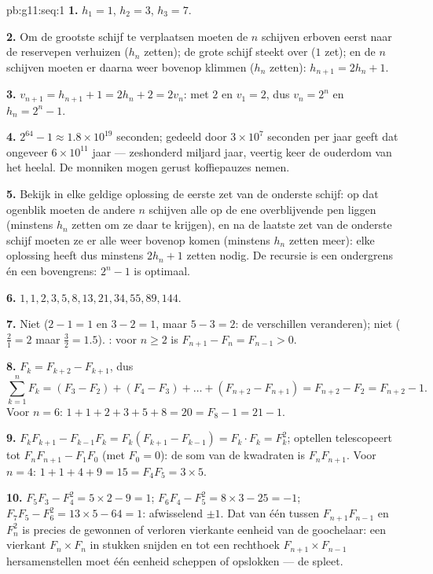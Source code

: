 \begin{solution}{pb:g11:seq:1}
\textbf{1.} $h_1 = 1$, $h_2 = 3$, $h_3 = 7$.

\textbf{2.} Om de grootste schijf te verplaatsen moeten de $n$ schijven
erboven eerst naar de reservepen verhuizen ($h_n$ zetten); de grote schijf
steekt over ($1$ zet); en de $n$ schijven moeten er daarna weer bovenop
klimmen ($h_n$ zetten): $h_{n+1} = 2h_n + 1$.

\textbf{3.} $v_{n+1} = h_{n+1} + 1 = 2h_n + 2 = 2v_n$:  met 
$2$ en $v_1 = 2$, dus $v_n = 2^n$ en $h_n = 2^n - 1$.

\textbf{4.} $2^{64} - 1 \approx 1.8 \times 10^{19}$ seconden; gedeeld door
$3 \times 10^7$ seconden per jaar geeft dat ongeveer $6 \times 10^{11}$
jaar --- zeshonderd miljard jaar, veertig keer de ouderdom van het heelal.
De monniken mogen gerust koffiepauzes nemen.

\textbf{5.} Bekijk in elke geldige oplossing de eerste zet van de onderste
schijf: op dat ogenblik moeten de andere $n$ schijven alle op de ene
overblijvende pen liggen (minstens $h_n$ zetten om ze daar te krijgen), en na
de laatste zet van de onderste schijf moeten ze er alle weer bovenop komen
(minstens $h_n$ zetten meer): elke oplossing heeft dus minstens $2h_n + 1$
zetten nodig. De recursie is een ondergrens én een bovengrens: $2^n - 1$ is
optimaal.

\textbf{6.} $1, 1, 2, 3, 5, 8, 13, 21, 34, 55, 89, 144$.

\textbf{7.} Niet  ($2 - 1 = 1$ en $3 - 2 = 1$, maar
$5 - 3 = 2$: de verschillen veranderen); niet  ($\frac21 = 2$
maar $\frac32 = 1.5$). : voor $n \geq 2$ is
$F_{n+1} - F_n = F_{n-1} > 0$.

\textbf{8.} $F_k = F_{k+2} - F_{k+1}$, dus
\[
\sum_{k=1}^{n} F_k = (F_3 - F_2) + (F_4 - F_3) + \dots +
(F_{n+2} - F_{n+1}) = F_{n+2} - F_2 = F_{n+2} - 1 .
\]
Voor $n = 6$: $1 + 1 + 2 + 3 + 5 + 8 = 20 = F_8 - 1 = 21 - 1$.

\textbf{9.} $F_k F_{k+1} - F_{k-1} F_k = F_k (F_{k+1} - F_{k-1}) =
F_k \cdot F_k = F_k^2$; optellen telescopeert tot $F_n F_{n+1} - F_1 F_0$
(met $F_0 = 0$): de som van de kwadraten is $F_n F_{n+1}$. Voor $n = 4$:
$1 + 1 + 4 + 9 = 15 = F_4 F_5 = 3 \times 5$.

\textbf{10.} $F_5 F_3 - F_4^2 = 5 \times 2 - 9 = 1$;
$F_6 F_4 - F_5^2 = 8 \times 3 - 25 = -1$;
$F_7 F_5 - F_6^2 = 13 \times 5 - 64 = 1$: afwisselend $\pm 1$. Dat 
van één tussen $F_{n+1} F_{n-1}$ en $F_n^2$ is precies de gewonnen of
verloren vierkante eenheid van de goochelaar: een vierkant
$F_n \times F_n$ in stukken snijden en tot een rechthoek
$F_{n+1} \times F_{n-1}$ hersamenstellen moet één eenheid scheppen of
opslokken --- de spleet.


\end{solution}
